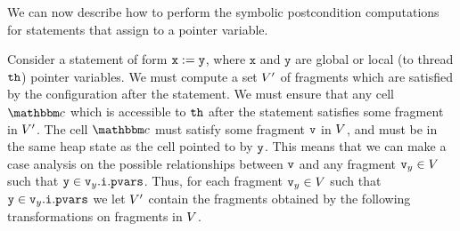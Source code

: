We can now describe how to perform the symbolic postcondition computations for
statements that assign to a pointer variable.

Consider a statement of form
${\tt x := y}$, where $\mathtt{x}$ and $\mathtt{y}$ are global or local
(to thread ${\tt th}$) pointer variables. We must compute a set $V'$ of
fragments which are satisfied by the configuration after the statement.
We must ensure that any cell $\cell$ which is accessible to ${\tt th}$ after
the statement satisfies some fragment in $V'$.
The cell $\cell$ must satisfy some
fragment $\mathtt{v}$ in $V$, and must be in the same heap state as
the cell pointed to by $\mathtt{y}$. 
This means that we can make a case analysis on the possible relationships
between $\mathtt{v}$ and any fragment $\mathtt{v}_y\in V$ such that
$\mathtt{y} \in \mathtt{v}_y.\mathtt{i}.\mathtt{pvars}$.
Thus, for each fragment $\mathtt{v}_y\in V$ such that
$\mathtt{y} \in \mathtt{v}_y.\mathtt{i}.\mathtt{pvars}$ we let $V'$ contain
the fragments obtained by the following transformations on fragments in
$V$.

